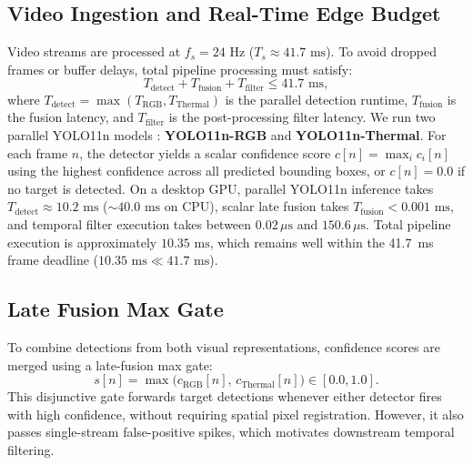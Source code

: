 \documentclass[conference]{IEEEtran}
\begin{document}
\subsection{Video Ingestion and Real-Time Edge Budget}
Video streams are processed at $f_s = 24\text{ Hz}$ ($T_s \approx 41.7\text{ ms}$). To avoid dropped frames or buffer delays, total pipeline processing must satisfy:
\begin{equation}
T_{\text{detect}} + T_{\text{fusion}} + T_{\text{filter}} \le 41.7\text{ ms},
\label{eq:realtime_budget}
\end{equation}
where $T_{\text{detect}} = \max(T_{\text{RGB}}, T_{\text{Thermal}})$ is the parallel detection runtime, $T_{\text{fusion}}$ is the fusion latency, and $T_{\text{filter}}$ is the post-processing filter latency. We run two parallel YOLO11n models \cite{jocher2024yolo11}: \textbf{YOLO11n-RGB} and \textbf{YOLO11n-Thermal}. For each frame $n$, the detector yields a scalar confidence score $c[n] = \max_i c_i[n]$ using the highest confidence across all predicted bounding boxes, or $c[n] = 0.0$ if no target is detected. On a desktop GPU, parallel YOLO11n inference takes $T_{\text{detect}} \approx 10.2\text{ ms}$ ($\sim 40.0\text{ ms}$ on CPU), scalar late fusion takes $T_{\text{fusion}} < 0.001\text{ ms}$, and temporal filter execution takes between $0.02\,\mu\text{s}$ and $150.6\,\mu\text{s}$. Total pipeline execution is approximately $10.35\text{ ms}$, which remains well within the 41.7~ms frame deadline ($10.35\text{ ms} \ll 41.7\text{ ms}$).

\subsection{Late Fusion Max Gate}
To combine detections from both visual representations, confidence scores are merged using a late-fusion max gate:
\begin{equation}
s[n] = \max\big(c_{\text{RGB}}[n], \, c_{\text{Thermal}}[n]\big) \in [0.0, 1.0].
\label{eq:late_fusion}
\end{equation}
This disjunctive gate forwards target detections whenever either detector fires with high confidence, without requiring spatial pixel registration. However, it also passes single-stream false-positive spikes, which motivates downstream temporal filtering.
\end{document}
